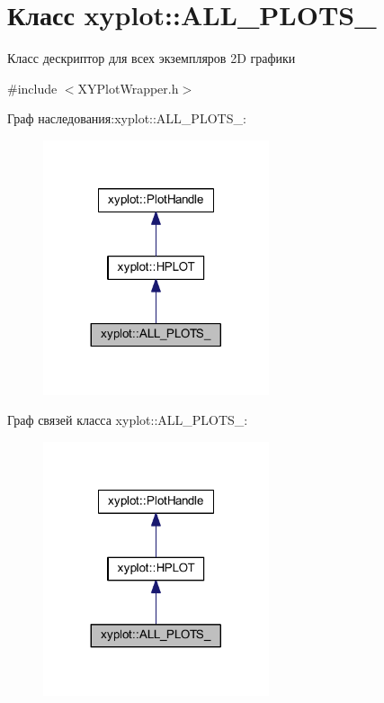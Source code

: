 \hypertarget{classxyplot_1_1_a_l_l___p_l_o_t_s__}{\section{Класс xyplot\-:\-:A\-L\-L\-\_\-\-P\-L\-O\-T\-S\-\_\-}
\label{classxyplot_1_1_a_l_l___p_l_o_t_s__}
}


Класс дескриптор для всех экземпляров 2\-D графики  




{\ttfamily \#include $<$X\-Y\-Plot\-Wrapper.\-h$>$}



Граф наследования\-:xyplot\-:\-:A\-L\-L\-\_\-\-P\-L\-O\-T\-S\-\_\-\-:\nopagebreak
\begin{figure}[H]
\begin{center}
\leavevmode
\includegraphics[width=188pt]{classxyplot_1_1_a_l_l___p_l_o_t_s____inherit__graph}
\end{center}
\end{figure}


Граф связей класса xyplot\-:\-:A\-L\-L\-\_\-\-P\-L\-O\-T\-S\-\_\-\-:\nopagebreak
\begin{figure}[H]
\begin{center}
\leavevmode
\includegraphics[width=188pt]{classxyplot_1_1_a_l_l___p_l_o_t_s____coll__graph}
\end{center}
\end{figure}
